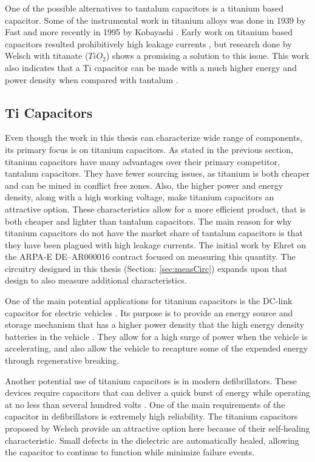 One of the possible alternatives to tantalum capacitors is a titanium based capacitor. Some of the instrumental work in titanium alloys was done in 1939 by Fast \cite{fast1939transition} and more recently in 1995 by Kobayashi \cite{kobayashi1995mechanical}\cite{corwin2013synthesis}. Early work on titanium based capacitors resulted prohibitively high leakage currents \cite{ki2005titanium}, but research done by Welsch \cite{welsch22nd}\cite{welsch2001directionally} with titanate ($TiO_2$) shows a promising a solution to this issue. This work also indicates that a Ti capacitor can be made with a much higher energy and power density when compared with tantalum \cite{steve_thesis}.


\subsection{Ti Capacitors}

Even though the work in this thesis can characterize wide range of components, its primary focus is on titanium capacitors. As stated in the previous section, titanium capacitors have many advantages over their primary competitor, tantalum capacitors. They have fewer sourcing issues, as titanium is both cheaper and can be mined in conflict free zones. Also, the higher power and energy density, along with a high working voltage, make titanium capacitors an attractive option. These characteristics allow for a more efficient product, that is both cheaper and lighter than tantalum capacitors.  The main reason for why titanium capacitors do not have the market share of tantalum capacitors is that they have been plagued with high leakage currents. The initial work by Ehret\cite{steve_thesis} on the ARPA-E DE--AR000016 contract focused on measuring this quantity. The circuitry designed in this thesis (Section: \ref{sec:measCirc}) expands upon that design to also measure additional characteristics.

One of the main potential applications for titanium capacitors is the DC-link capacitor for electric vehicles \cite{dclink}. Its purpose is to provide an energy source and storage mechanism that has a higher power density that the high energy density batteries in the vehicle \cite{thounthong2006control}. They allow for a high surge of power when the vehicle is accelerating, and also allow the vehicle to recapture some of the expended energy through regenerative breaking.

Another potential use of titanium capacitors is in modern defibrillators. These devices require capacitors that can deliver a quick burst of energy while operating at no less than several hundred volts \cite{shephard1961design}\cite{idiot_defibrillator}. One of the main requirements of the capacitor in defibrillators is extremely high reliability. The titanium capacitors proposed by Welsch \cite{welsch22nd} provide an attractive option here because of their self-healing characteristic. Small defects in the dielectric are automatically healed, allowing the capacitor to continue to function while minimize failure events. 


